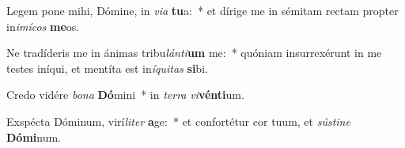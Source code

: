 \item Legem pone mihi, Dómine, in \textit{vi}\textit{a} \textbf{tu}a:~* et dírige me in sémitam rectam propter in\textit{i}\textit{mí}\textit{cos} \textbf{me}os.
\item Ne tradíderis me in ánimas tribu\textit{lán}\textit{ti}\textbf{um} me:~* quóniam insurrexérunt in me testes iníqui, et mentíta est in\textit{í}\textit{qui}\textit{tas} \textbf{si}bi.
\item Credo vidére \textit{bo}\textit{na} \textbf{Dó}mini~* in \textit{ter}\textit{ra} \textit{vi}\textbf{vén}\textbf{ti}um.
\item Exspécta Dóminum, virí\textit{li}\textit{ter} \textbf{a}ge:~* et confortétur cor tuum, et \textit{sús}\textit{ti}\textit{ne} \textbf{Dó}\textbf{mi}num.
